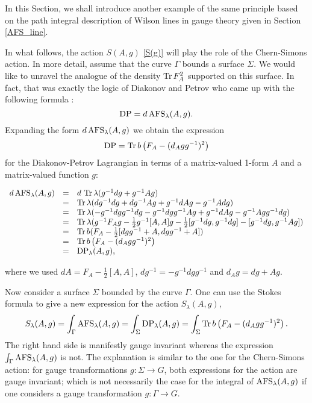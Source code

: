 \documentclass[11pt]{report}
\theoremstyle{plain}
\theoremstyle{definition}
\theoremstyle{remark}
\theoremstyle{remark}
\numberwithin{equation}{section}
\begin{document}
In this Section, we shall introduce another example of the same principle based on the path integral description of Wilson lines in gauge theory given in Section \ref{AFS_line}. 



In what follows, the action $S(A,g)$ \eqref{S(g)} will play the role of the Chern-Simons action. In more detail, assume that the curve $\Gamma$ bounds a surface $\Sigma$. We would like to unravel the analogue of the density ${\rm Tr}\, F_A^2$ supported on this surface. In fact, that was exactly the logic of Diakonov and Petrov who came up with the following formula \cite{DP}:
%
\begin{equation}
{\rm DP} = d \, {\rm AFS}_\lambda(A,g).
\end{equation}
Expanding the form $d \, {\rm AFS}_\lambda(A,g)$ we obtain the expression 
\begin{equation}\label{DPL}
{\rm DP} = {\rm Tr} \, b \left( F_A - (d_A g g^{-1})^2 \right)
\end{equation}
for the Diakonov-Petrov Lagrangian in terms of  a matrix-valued 1-form $A$ and a matrix-valued function $g$:

%
\begin{spacing}{1.45}
$
\begin{array}{lll} 
d \, {\rm AFS}_\lambda(A,g) & = & d\,\, {\rm Tr} \, \lambda(g^{-1} dg + g^{-1} A g) \\
& = & {\rm Tr} \, \lambda(d g^{-1} dg + d g^{-1} Ag + g^{-1} dA g - g^{-1} A dg) \\ 
& = & {\rm Tr} \, \lambda (-g^{-1} dg g^{-1} dg - g^{-1} dg g^{-1} Ag + g^{-1} dA g - g^{-1} Ag g^{-1} dg) \\
& = & {\rm Tr} \, \lambda (g^{-1} F_A g - \frac{1}{2} g^{-1}[A,A] g - \frac{1}{2} [g^{-1} dg , g^{-1} dg] - [g^{-1} dg , g^{-1} Ag]) \\
& = & {\rm Tr} \, b ( F_A - \frac{1}{2} [dg g^{-1} + A , dg g^{-1} + A] ) \\
& = & {\rm Tr} \, b \left( F_A - (d_A g g^{-1})^2 \right) \\
& = & {\rm DP}_\lambda(A,g),
\end{array}
$
\end{spacing}
where we used $dA = F_A - \frac{1}{2} [A,A]$, $dg^{-1} = -g^{-1} dg g^{-1}$ and $d_A g = dg + Ag$.

Now consider a surface $\Sigma$ bounded by the curve $\Gamma$. One can use the Stokes formula to give a new expression for the 
action $S_\lambda(A,g)$,
%
$$
S_\lambda(A,g)= \int_\Gamma {\rm AFS}_\lambda(A,g) = \int_\Sigma {\rm DP}_\lambda(A,g) = 
\int_\Sigma {\rm Tr} \, b \left( F_A - (d_A g g^{-1})^2 \right).
$$
The right hand side is manifestly gauge invariant whereas the expression $\int_\Gamma {\rm AFS}_\lambda(A,g)$ is not. The explanation is similar to the one for the Chern-Simons action: for gauge transformations $g: \Sigma \to G$, both expressions for the action are gauge invariant; which is not necessarily the case for the integral of ${\rm AFS}_\lambda(A,g)$ if one considers a gauge transformation $g: \Gamma \to G$. 
\end{document}
